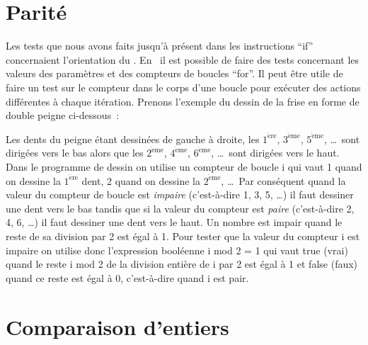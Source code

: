 \section{Parité}
Les tests que nous avons faits jusqu'à présent dans les instructions
``if'' concernaient l'orientation du \robot.  En \ocaml\ il est
possible de faire des tests concernant les valeurs des paramètres et des
compteurs de boucles ``for''.  Il peut être utile de faire un test sur le compteur
dans le corps d'une boucle pour exécuter des actions différentes à
chaque itération.  Prenons l'exemple du dessin de la frise en forme de
double peigne ci-dessous~:

 {\raggedright
   }

Les dents du peigne étant dessinées de gauche à droite, les
$1^{\mathrm{\grave{e}re}}$, $3^{\mathrm{\grave{e}me}}$,
$5^{\mathrm{\grave{e}me}}$, \ldots\ sont dirigées vers le bas alors
que les $2^{\mathrm{\grave{e}me}}$, $4^{\mathrm{\grave{e}me}}$,
$6^{\mathrm{\grave{e}me}}$, \ldots\ sont dirigées vers le haut.  Dans
le programme de dessin on utilise un compteur de boucle {\idt i} qui
vaut 1 quand on dessine la $1^{\mathrm{\grave{e}re}}$ dent, 2 quand on
dessine la $2^{\mathrm{\grave{e}me}}$, \ldots\ Par conséquent quand la
valeur du compteur de boucle est {\em impaire} (c'est-à-dire 1, 3, 5,
\ldots) il faut dessiner une dent vers le bas tandis que si la valeur
du compteur est {\em paire} (c'est-à-dire 2, 4, 6, \ldots) il faut
dessiner une dent vers le haut.  Un nombre est impair
quand le reste de sa division par 2 est égal à 1. Pour tester que la
valeur du compteur {\idt i} est impaire on utilise donc l'expression
booléenne {\idt i mod 2 = 1} qui vaut {\idt true} (vrai) quand le reste
{\idt i mod 2} de la division entière de {\idt i} par 2 est égal à 1 et
{\idt false} (faux) quand ce reste est égal à 0, c'est-à-dire quand
{\idt i} est pair.
\newpage



\section{Comparaison d'entiers}

